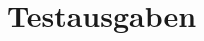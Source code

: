 \documentclass[12pt,a4paper]{article}
\begin{document}
%
%
%
%
%
%
%
%
%
%
%
%
%
%
%
%
%
%
%
%
%
%
%
%
%
%
%
%
%
%
%
%
%
%
%
%
%
%
%
%
%
%
%
%
%
%
%
%
%
%
%

\section {Testausgaben} 

\begin {verbatim}

\end {verbatim}
\end{document}
